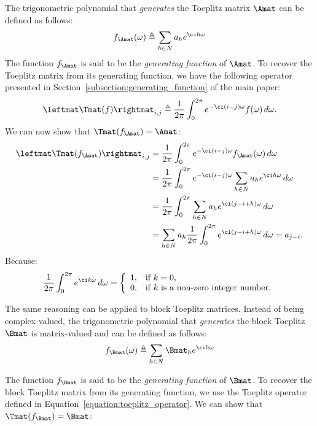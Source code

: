 The trigonometric polynomial that \emph{generates} the Toeplitz matrix $\Amat$ can be defined as follows:
\begin{equation}
  f_{\Amat}(\omega) \triangleq \sum_{h \in N} a_h e^{\ci h \omega}
\end{equation}
The function $f_{\Amat}$ is said to be the \emph{generating function} of $\Amat$. To recover the Toeplitz matrix from its generating function, we have the following operator presented in Section~\ref{subsection:generating_function} of the main paper:
\begin{equation} \label{equation:toeplitz_operator}
  \leftmat \Tmat(f) \rightmat_{i, j} \triangleq  \frac{1}{2\pi} \int_0^{2\pi} e^{-\ci (i - j)\omega} f(\omega) \,d\omega .
\end{equation}
We can now show that $\Tmat(f_{\Amat}) = \Amat$: 
\begingroup
\allowdisplaybreaks
\begin{align}
    \leftmat \Tmat(f_\Amat) \rightmat_{i, j} &= \frac{1}{2\pi} \int_0^{2\pi} e^{-\ci (i-j)\omega} f_{\Amat}(\omega) \,d\omega  \\
    &= \frac{1}{2\pi} \int_0^{2\pi} e^{-\ci (i-j) \omega} \sum_{h \in N} a_h e^{\ci h \omega} \,d\omega  \\
    &= \frac{1}{2\pi} \int_0^{2\pi} \sum_{h \in N} a_h e^{\ci (j - i + h) \omega} \,d\omega  \\
    &= \sum_{h \in N} a_h \frac{1}{2\pi} \int_0^{2\pi} e^{\ci (j - i + h) \omega} \,d\omega 
    = a_{j-i} .
\end{align}
\endgroup
Because:
\begin{equation}
    \frac{1}{2\pi} \int_0^{2\pi} e^{\ci k \omega} \,d\omega = \left\{
                \begin{array}{ll}
                  1, & \text{if}\ k = 0, \\
                  0, & \text{if}\ k\ \text{is a non-zero integer number.}
                \end{array}
                \right.
\end{equation}

The same reasoning can be applied to block Toeplitz matrices. Instead of being complex-valued, the trigonometric polynomial that {\em generates} the block Toeplitz $\Bmat$ is matrix-valued and can be defined as follows:
\begin{equation}
  f_{\Bmat}(\omega) \triangleq \sum_{h \in N} \Bmat_h e^{\ci h \omega}
\end{equation}

The function $f_{\Bmat}$ is said to be the \emph{generating function} of $\Bmat$. To recover the block Toeplitz matrix from its generating function, we use the Toeplitz operator defined in Equation~\ref{equation:toeplitz_operator}. We can show that $\Tmat(f_\Bmat) = \Bmat$:


